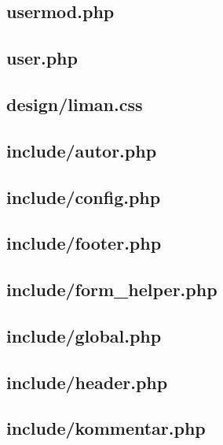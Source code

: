 \subsection{usermod.php}


\subsection{user.php}


\subsection{design/liman.css}


\subsection{include/autor.php}


\subsection{include/config.php}


\subsection{include/footer.php}


\subsection{include/form\_helper.php}


\subsection{include/global.php}


\subsection{include/header.php}


\subsection{include/kommentar.php}


